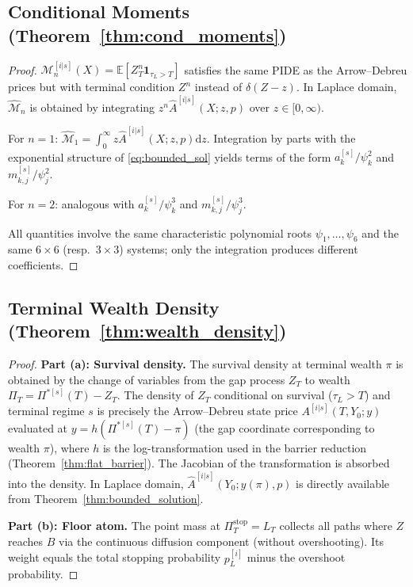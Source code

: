 \documentclass[11pt,a4paper]{article}
\numberwithin{equation}{section}
\newcommand{\E}{\mathbb{E}}
\newcommand{\dd}{\mathrm{d}}
\newcommand{\ind}{\mathbf{1}}
\begin{document}
\begin{appendices}
\subsection{Conditional Moments (Theorem~\ref{thm:cond_moments})}\label{app:cond_moments}

\begin{proof}
$\mathcal{M}^{[i|s]}_n(X) = \E[Z_T^n \ind_{\tau_L > T}]$ satisfies the same PIDE as the Arrow--Debreu prices but with terminal condition $Z^n$ instead of $\delta(Z-z)$. In Laplace domain, $\hat{\mathcal{M}}_n$ is obtained by integrating $z^n \hat{A}^{[i|s]}(X; z, p)$ over $z \in [0, \infty)$.

For $n = 1$: $\hat{\mathcal{M}}_1 = \int_0^\infty z \hat{A}^{[i|s]}(X;z,p) \dd z$. Integration by parts with the exponential structure of \eqref{eq:bounded_sol} yields terms of the form $a^{[s]}_k/\psi_k^2$ and $m^{[s]}_{k,j}/\psi_j^2$.

For $n = 2$: analogous with $a^{[s]}_k/\psi_k^3$ and $m^{[s]}_{k,j}/\psi_j^3$.

All quantities involve the same characteristic polynomial roots $\psi_1, \ldots, \psi_6$ and the same $6 \times 6$ (resp.\ $3 \times 3$) systems; only the integration produces different coefficients.
\end{proof}


\subsection{Terminal Wealth Density (Theorem~\ref{thm:wealth_density})}\label{app:wealth_density}

\begin{proof}
\textbf{Part (a): Survival density.} The survival density at terminal wealth $\pi$ is obtained by the change of variables from the gap process $Z_T$ to wealth $\Pi_T = \Pi^{*[s]}(T) - Z_T$. The density of $Z_T$ conditional on survival ($\tau_L > T$) and terminal regime $s$ is precisely the Arrow--Debreu state price $A^{[i|s]}(T, Y_0; y)$ evaluated at $y = h(\Pi^{*[s]}(T) - \pi)$ (the gap coordinate corresponding to wealth $\pi$), where $h$ is the log-transformation used in the barrier reduction (Theorem~\ref{thm:flat_barrier}). The Jacobian of the transformation is absorbed into the density. In Laplace domain, $\hat{A}^{[i|s]}(Y_0; y(\pi), p)$ is directly available from Theorem~\ref{thm:bounded_solution}.

\textbf{Part (b): Floor atom.} The point mass at $\Pi^{\mathrm{stop}}_T = L_T$ collects all paths where $Z$ reaches $B$ via the continuous diffusion component (without overshooting). Its weight equals the total stopping probability $p^{[i]}_L$ minus the overshoot probability.


\end{proof}
\end{appendices}
\end{document}
